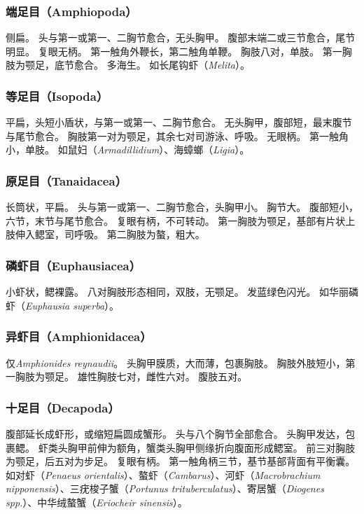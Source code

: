 \documentclass[11pt]{article}
\begin{document}
\subsubsection{端足目（Amphiopoda）}
侧扁。
头与第一或第一、二胸节愈合，无头胸甲。
腹部末端二或三节愈合，尾节明显。
复眼无柄。
第一触角外鞭长，第二触角单鞭。
胸肢八对，单肢。
第一胸肢为颚足，底节愈合。
多海生。
如长尾钩虾（\textit{Melita}）。

\subsubsection{等足目（Isopoda）}
平扁，头短小盾状，与第一或第一、二胸节愈合。
无头胸甲，腹部短，最末腹节与尾节愈合。
胸肢第一对为颚足，其余七对司游泳、呼吸。
无眼柄。
第一触角小，单肢。
如鼠妇（\textit{Armadillidium}）、海蟑螂（\textit{Ligia}）。

\subsubsection{原足目（Tanaidacea）}
长筒状，平扁。
头与第一或第一、二胸节愈合，头胸甲小。
胸节大。
腹部短小，六节，末节与尾节愈合。
复眼有柄，不可转动。
第一胸肢为颚足，基部有片状上肢伸入鳃室，司呼吸。
第二胸肢为螯，粗大。

\subsubsection{磷虾目（Euphausiacea）}
小虾状，鳃裸露。
八对胸肢形态相同，双肢，无颚足。
发蓝绿色闪光。
如华丽磷虾（\textit{Euphausia superba}）。

\subsubsection{异虾目（Amphionidacea）}
仅\textit{Amphionides reynaudii}。
头胸甲膜质，大而薄，包裹胸肢。
胸肢外肢短小，第一胸肢为颚足。
雄性胸肢七对，雌性六对。
腹肢五对。

\subsubsection{十足目（Decapoda）}
腹部延长成虾形，或缩短扁圆成蟹形。
头与八个胸节全部愈合。
头胸甲发达，包裹鳃。
虾类头胸甲前伸为额角，蟹类头胸甲侧缘折向腹面形成鳃室。
前三对胸肢为颚足，后五对为步足。
复眼有柄。
第一触角柄三节，基节基部背面有平衡囊。
如对虾（\textit{Penaeus orientalis}）、螯虾（\textit{Cambarus}）、河虾（\textit{Macrobrachium nipponensis}）、三疣梭子蟹（\textit{Portunus trituberculatus}）、寄居蟹（\textit{Diogenes spp.}）、中华绒螯蟹（\textit{Eriocheir sinensis}）。
\end{document}
